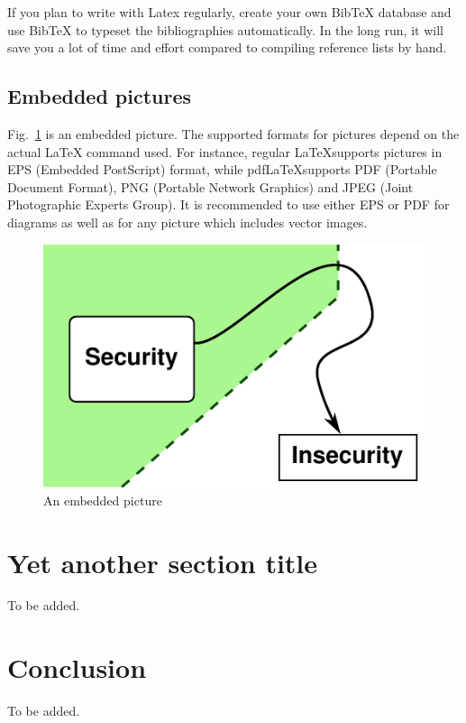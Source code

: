 \documentclass[article]{aaltoseries}
\begin{document}
If you plan to write with Latex regularly, create your own BibTeX
database and use BibTeX to typeset the bibliographies automatically.
In the long run, it will save you a lot of time and effort compared to
compiling reference lists by hand.




\subsection{Embedded pictures}
\label{sec:pictures}

Fig.~\ref{fig:mypicture1} is an embedded picture. The supported formats for pictures
depend on the actual LaTeX command used. For instance, regular \LaTeX supports
pictures in EPS (Embedded PostScript) format, while pdf\LaTeX supports PDF (Portable
Document Format), PNG (Portable Network Graphics) and JPEG (Joint Photographic Experts
Group). It is recommended to use either EPS or PDF for diagrams as well as for any picture
which includes vector images.

\begin{figure}[t!]
  \begin{center}
    \includegraphics[width=.5\textwidth]{figures/sample}
    \caption{An embedded picture}
    \label{fig:mypicture1}
  \end{center}
\end{figure}




\section{Yet another section title}

To be added.




\section{Conclusion}

To be added.






\end{document}

